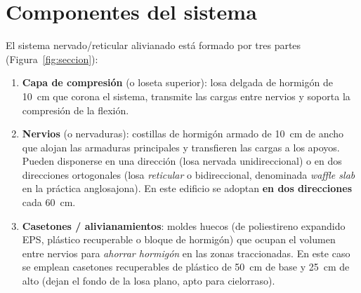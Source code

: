 \section{Componentes del sistema}
\label{sec:componentes}

El sistema nervado/reticular alivianado está formado por tres partes
(Figura~\ref{fig:seccion}):

\begin{enumerate}
  \item \textbf{Capa de compresión} (o loseta superior): losa delgada
        de hormigón de \SI{10}{\centi\meter} que corona el sistema,
        transmite las cargas entre nervios y soporta la compresión de
        la flexión.
  \item \textbf{Nervios} (o nervaduras): costillas de hormigón armado
        de \SI{10}{\centi\meter} de ancho que alojan las armaduras
        principales y transfieren las cargas a los apoyos. Pueden
        disponerse en una dirección (losa nervada unidireccional) o en
        dos direcciones ortogonales (losa \emph{reticular} o
        bidireccional, denominada \emph{waffle slab} en la práctica
        anglosajona). En este edificio se adoptan \textbf{en dos
        direcciones} cada \SI{60}{\centi\meter}.
  \item \textbf{Casetones / alivianamientos}: moldes huecos (de
        poliestireno expandido EPS, plástico recuperable o bloque de
        hormigón) que ocupan el volumen entre nervios para \emph{ahorrar
        hormigón} en las zonas traccionadas. En este caso se emplean
        casetones recuperables de plástico de \SI{50}{\centi\meter} de
        base y \SI{25}{\centi\meter} de alto (dejan el fondo de la losa
        plano, apto para cielorraso).
\end{enumerate}

